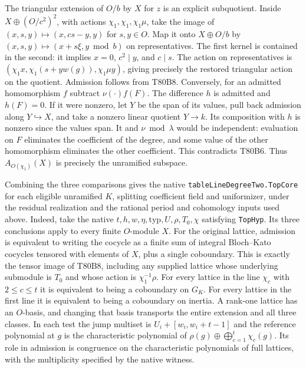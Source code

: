 The triangular extension of $O/b$ by $X$ for $z$ is an explicit
subquotient. Inside $X\oplus(O/c^2)^2$, with actions
$\chi_1,\chi_1,\chi_1\mu$, take the image of
$(x,s,y)\mapsto(x,cs-y,y)$ for $s,y\in O$.
Map it onto $X\oplus O/b$ by $(x,s,y)\mapsto(x+s\xi,y\bmod b)$
on representatives. The first kernel is contained in the second:
it implies $x=0$, $c^2\mid y$, and $c\mid s$. The action on
representatives is
$(\chi_1 x,\chi_1(s+yw(g)),\chi_1\mu y)$, giving precisely the
restored triangular action on the quotient. Admission follows from
T80B8. Conversely, for an admitted homomorphism $f$ subtract
$\nu(\cdot)f(F)$. The difference $h$ is admitted and $h(F)=0$.
If it were nonzero, let $Y$ be the span of its values, pull back
admission along $Y\hookrightarrow X$, and take a nonzero linear
quotient $Y\to k$. Its composition with $h$ is nonzero since the
values span. It and $\nu\bmod\lambda$ would be independent:
evaluation on $F$ eliminates the coefficient of the degree, and
some value of the other homomorphism eliminates the other coefficient.
This contradicts T80B6. Thus $A_{O(\chi_1)}(X)$ is precisely the
unramified subspace.

Combining the three comparisons gives the native
\texttt{tableLineDegreeTwo.TopCore} for each eligible unramified $K$,
splitting coefficient field and uniformizer, under the residual realization
and the rational period and cohomology inputs used above. Indeed, take
the native $t,h,w,\eta,\mathrm{typ},U,\rho,T_0,\chi$ satisfying
\texttt{TopHyp}. Its three conclusions apply to every finite
$O$-module $X$. For the original lattice, admission is equivalent to
writing the cocycle as a finite sum of integral Bloch--Kato cocycles
tensored with elements of $X$, plus a single coboundary. This is exactly
the tensor image of T80B8, including any supplied lattice whose underlying
submodule is $T_0$ and whose action is $\chi_1^{-1}\rho$. For every
lattice in the line $\chi_c$ with $2\le c\le t$ it is equivalent
to being a coboundary on $G_K$. For every lattice in the first line it
is equivalent to being a coboundary on inertia. A rank-one lattice has an
$O$-basis, and changing that basis transports the entire extension and
all three classes. In each test the jump multiset is
$U_i+[w_i,w_i+t-1]$ and the reference polynomial at $g$ is the
characteristic polynomial of $\rho(g)\oplus\bigoplus_{c=1}^t\chi_c(g)$.
Its role in admission is congruence on the characteristic polynomials
of full lattices, with the multiplicity specified by the native witness.

